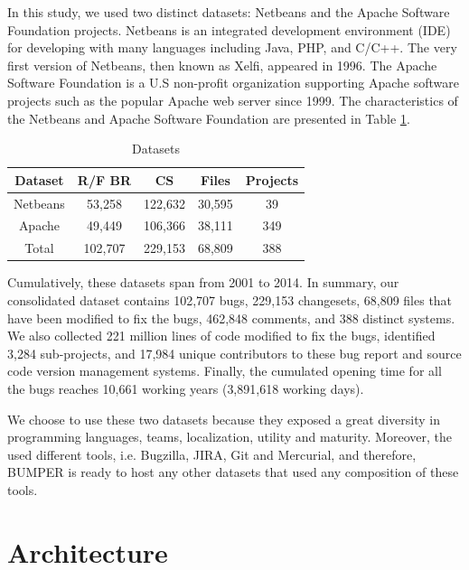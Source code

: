 In this study, we used two distinct datasets: Netbeans and
the Apache Software Foundation projects. Netbeans is an
integrated development environment (IDE) for developing
with many languages including Java, PHP, and C/C++. The
very first version of Netbeans, then known as Xelfi, appeared
in 1996. The Apache Software Foundation is a U.S non-profit
organization supporting Apache software projects such as the
popular Apache web server since 1999. The characteristics of
the Netbeans and Apache Software Foundation are presented in Table \ref{table:datasets}.

\begin{table}[h]
\begin{center}
\begin{tabular}{@{}c|c|c|c|c@{}}
\textbf{Dataset} & \textbf{R/F BR} & \textbf{CS} & \textbf{Files} & \textbf{Projects} \\ \hline \hline
Netbeans         & 53,258          & 122,632     & 30,595         & 39                \\
Apache           & 49,449          & 106,366     & 38,111         & 349               \\
Total            & 102,707         & 229,153     & 68,809         & 388               \\ \hline \hline

\end{tabular}
\end{center}

\caption{Datasets\label{table:datasets}}
\end{table}

Cumulatively, these datasets span from 2001 to 2014. In
summary, our consolidated dataset contains 102,707 bugs,
229,153 changesets, 68,809 files that have been modified to
fix the bugs, 462,848 comments, and 388 distinct systems.
We also collected 221 million lines of code modified to fix
the bugs, identified 3,284 sub-projects, and 17,984 unique
contributors to these bug report and source code version
management systems. Finally, the cumulated opening time for
all the bugs reaches 10,661 working years (3,891,618
working days).

We choose to use these two datasets because they exposed a great diversity in programming languages, teams, localization, utility and maturity. Moreover, the used different tools, i.e. Bugzilla, JIRA, Git and Mercurial, and therefore, BUMPER is ready to host any other datasets that used any composition of these tools.

\section{Architecture}

